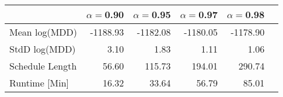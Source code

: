 \begin{tabular} {lrrrrr} 
 \hline \hline 
&$\alpha = $0.90&$\alpha = $0.95&$\alpha = $0.97&$\alpha = $0.98\\ 
 \hline 
Mean log(MDD)&-1188.93&-1182.08&-1180.05&-1178.90\\ 
StdD log(MDD)&3.10&1.83&1.11&1.06\\ 
Schedule Length&56.60&115.73&194.01&290.74\\ 
Runtime [Min]&16.32&33.64&56.79&85.01\\ 
\hline 
\end{tabular}